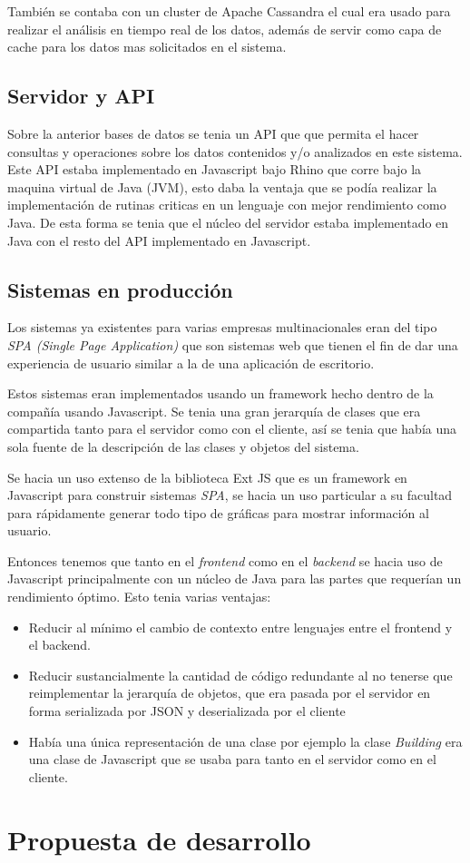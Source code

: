 También se contaba con un cluster de Apache Cassandra el cual era usado
para realizar el análisis en tiempo real de los datos, además de servir
como capa de cache para los datos mas solicitados en el sistema.

\subsection{Servidor y API}
Sobre la anterior bases de datos se tenia un API que que permita el
hacer consultas y operaciones sobre los datos contenidos y/o analizados
en este sistema. Este API estaba implementado en Javascript bajo Rhino
que corre bajo la maquina virtual de Java (JVM), esto daba la ventaja
que se podía realizar la implementación de rutinas criticas en un
lenguaje con mejor rendimiento como Java. De esta forma se tenia que el
núcleo del servidor estaba implementado en Java con el resto del API
implementado en Javascript.

\subsection{Sistemas en producción}
Los sistemas ya existentes para varias empresas multinacionales
eran del tipo \textit{SPA (Single Page Application)} que son sistemas web
que tienen el fin de dar una experiencia de usuario similar a la
de una aplicación de escritorio.

Estos sistemas eran implementados usando un framework hecho dentro
de la compañía usando Javascript. Se tenia una gran jerarquía de clases
que era compartida tanto para el servidor como con el cliente,
así se tenia que había una sola fuente de la descripción
de las clases y objetos del sistema.

Se hacia un uso extenso de la biblioteca Ext JS que es un framework
en Javascript para construir sistemas \textit{SPA}, se hacia un uso particular
a su facultad para rápidamente generar todo tipo de gráficas para mostrar
información al usuario.

Entonces tenemos que tanto en el \textit{frontend} como en el \textit{backend}
se hacia uso de Javascript principalmente con un núcleo de Java para las partes
que requerían un rendimiento óptimo. Esto tenia varias ventajas:

\begin{itemize}
\item Reducir al mínimo el cambio de contexto entre lenguajes entre
  el frontend y el backend.
\item Reducir sustancialmente la cantidad de código redundante al no
  tenerse que reimplementar la jerarquía de objetos, que era pasada
  por el servidor en forma serializada por JSON y deserializada por el
  cliente
\item Había una única representación de una clase por ejemplo la
  clase \textit{Building} era una clase de Javascript que se usaba para
  tanto en el servidor como en el cliente.
\end{itemize}

\section{Propuesta de desarrollo}
